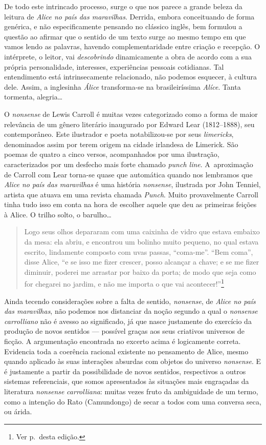 De todo este intrincado
processo, surge o que nos parece a grande beleza da leitura de
\emph{Alice no país das maravilhas}. Derrida, embora conceituando de
forma genérica, e não especificamente pensando no clássico inglês, bem
formulou a questão ao afirmar que o sentido de um texto surge ao mesmo
tempo em que vamos lendo as palavras, havendo complementaridade entre
criação e recepção. O intérprete, o leitor, vai \textit{descobrindo}
dinamicamente a obra de acordo com a sua própria personalidade,
interesses, experiências pessoais cotidianas. Tal entendimento está
intrinsecamente relacionado, não podemos esquecer, à cultura dele.
Assim, a inglesinha \textit{Álice} transforma-se na brasileiríssima
\textit{Alíce}. Tanta tormenta, alegria\ldots{}

O \emph{nonsense} de Lewis Carroll é muitas vezes categorizado como a
forma de maior relevância de um gênero literário inaugurado por Edward
Lear (1812--1888), seu contemporâneo. Este ilustrador e poeta
notabilizou-se por seus \emph{limericks}, denominados assim por terem
origem na cidade irlandesa de Limerick. São poemas de quatro a cinco
versos, acompanhados por uma ilustração, caracterizados por um desfecho
mais forte chamado \emph{punch line}. A~aproximação de Carroll com Lear
torna-se quase que automática quando nos lembramos que \emph{Alice no
país das maravilhas} é uma história \emph{nonsense}, ilustrada por John
Tenniel, artista que atuava em uma revista chamada \emph{Punch}. Muito
provavelmente Carroll tinha tudo isso em conta na hora de escolher
aquele que deu as primeiras feições à Alice. O trilho solto, o
barulho\ldots{}

\begin{quote}
Logo seus olhos depararam com uma caixinha de vidro que estava embaixo \label{ref3}
da mesa: ela abriu, e encontrou um bolinho muito pequeno, no qual estava
escrito, lindamente composto com uvas passas, ``coma-me''. ``Bem coma'',
disse Alice, ``e se isso me fizer crescer, posso alcançar a chave; e se
me fizer diminuir, poderei me arrastar por baixo da porta; de modo que
seja como for chegarei no jardim, e não me importa o que vai
acontecer!''\footnote{Ver p.\,\pageref{ref3} desta edição.}
\end{quote}

Ainda tecendo considerações sobre a falta de sentido, \emph{nonsense},
de \emph{Alice no país das maravilhas}, não podemos nos distanciar da
noção segundo a qual o \emph{nonsense carrolliano} não é avesso ao
significado, já que nasce justamente do exercício da produção de novos
sentidos --- possível graças aos seus criativos universos de ficção. A
argumentação encontrada no excerto acima é logicamente correta.
Evidencia toda a coerência racional existente no pensamento de Alice,
mesmo quando aplicado às suas interações absurdas com objetos do
universo \emph{nonsense}. E é justamente a partir da possibilidade de
novos sentidos, respectivos a outros sistemas referenciais, que somos
apresentados às situações mais engraçadas da literatura \emph{nonsense}
\textit{carrolliana}: muitas vezes fruto da ambiguidade de um termo, como a
intenção do Rato (Camundongo) de secar a todos com uma conversa seca, ou
árida.

